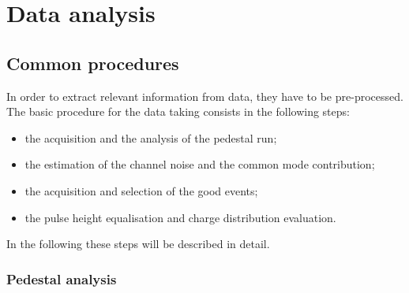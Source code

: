 \chapter{Data analysis}
\label{cap:data_analysis}

\section{Common procedures}

In order to extract relevant information from data, they have to be
pre-processed.
The basic procedure for the data taking consists in the following steps:
\begin{itemize}
\item the acquisition and the analysis of the pedestal run;
\item the estimation of the channel noise and the common mode contribution;
\item the acquisition and selection of the good events; 
\item the pulse height equalisation and charge distribution evaluation.
\end{itemize}
In the following these steps will be described in detail.

\subsection{Pedestal analysis}

